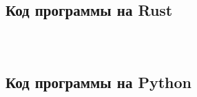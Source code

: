 \documentclass[a4paper,12pt]{article}
\begin{document}
\subsection{Код программы на Rust}

 \inputminted{rust}{code/main.rs}

 \inputminted{rust}{code/input.rs}

 \inputminted{rust}{code/engine.rs}

 \subsection{Код программы на Python}

 \inputminted{python}{code/main.py}

 \inputminted{python}{code/input.py}

 \inputminted{python}{code/engine.py}
\end{document}
